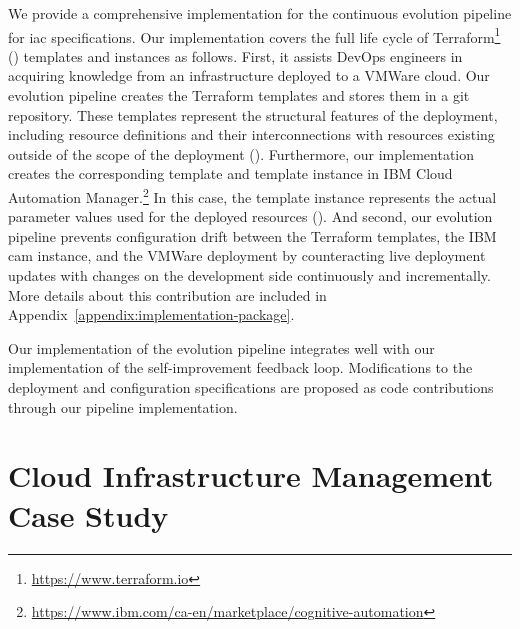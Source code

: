 \begin{description}[style=unboxed,leftmargin=0cm,font=\bfseries\normalsize]
	\item[An Implementation for the Continuous \gls{iac} Evolution Pipeline\autodot]
	We provide a comprehensive implementation for the continuous evolution pipeline for \gls{iac} specifications. Our implementation covers the full life cycle of Terraform\footnote{\url{https://www.terraform.io}} () templates and instances as follows. First, it assists DevOps engineers in acquiring knowledge from an infrastructure deployed to a VMWare cloud. Our evolution pipeline creates the Terraform templates and stores them in a git repository. These templates represent the structural features of the deployment, including resource definitions and their interconnections with resources existing outside of the scope of the deployment (). Furthermore, our implementation creates the corresponding template and template instance in IBM Cloud Automation Manager.\footnote{\url{https://www.ibm.com/ca-en/marketplace/cognitive-automation}} In this case, the template instance represents the actual parameter values used for the deployed resources (). And second, our evolution pipeline prevents configuration drift between the Terraform templates, the IBM \gls{cam} instance, and the VMWare deployment by counteracting live deployment updates with changes on the development side continuously and incrementally. More details about this contribution are included in Appendix~\ref{appendix:implementation-package}.
	
	Our implementation of the evolution pipeline integrates well with our implementation of the self-improvement feedback loop. Modifications to the deployment and configuration specifications are proposed as code contributions through our pipeline implementation.
\end{description}


\section{Cloud Infrastructure Management Case Study}
\label{sect:overview--iac-case-study}

